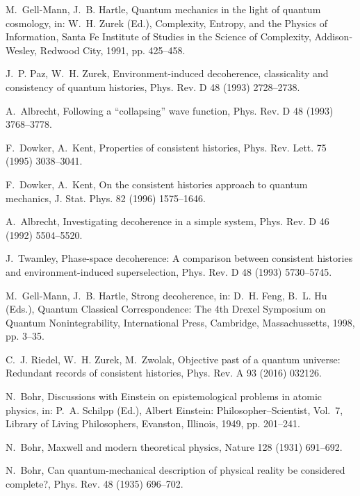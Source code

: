 \documentclass[3p,sort&compress,12pt]{elsarticle}
\begin{document}
\begin{thebibliography}{100}
M.~Gell-Mann, J.~B. Hartle, Quantum mechanics in the light of quantum
  cosmology, in: W.~H. Zurek (Ed.), Complexity, Entropy, and the Physics of
  Information, Santa Fe Institute of Studies in the Science of Complexity,
  Addison-Wesley, Redwood City, 1991, pp. 425--458.

J.~P. Paz, W.~H. Zurek, Environment-induced decoherence, classicality and
  consistency of quantum histories, Phys. Rev. D 48 (1993) 2728--2738.

A.~Albrecht, Following a ``collapsing'' wave function, Phys. Rev. D 48 (1993)
  3768--3778.

F.~Dowker, A.~Kent, Properties of consistent histories, Phys. Rev. Lett. 75
  (1995) 3038--3041.

F.~Dowker, A.~Kent, On the consistent histories approach to quantum mechanics,
  J. Stat. Phys. 82 (1996) 1575--1646.

A.~Albrecht, Investigating decoherence in a simple system, Phys. Rev. D 46
  (1992) 5504--5520.

J.~Twamley, Phase-space decoherence: {A} comparison between consistent
  histories and environment-induced superselection, Phys. Rev. D 48 (1993)
  5730--5745.

M.~Gell-Mann, J.~B. Hartle, Strong decoherence, in: D.~H. Feng, B.~L. Hu
  (Eds.), Quantum Classical Correspondence: The 4th Drexel Symposium on Quantum
  Nonintegrability, International Press, Cambridge, Massachussetts, 1998, pp.
  3--35.

C.~J. Riedel, W.~H. Zurek, M.~Zwolak, Objective past of a quantum universe:
  {R}edundant records of consistent histories, Phys. Rev. A 93 (2016) 032126.

N.~Bohr, Discussions with {E}instein on epistemological problems in atomic
  physics, in: P.~A. Schilpp (Ed.), Albert Einstein: Philosopher--Scientist,
  Vol.~7, Library of Living Philosophers, Evanston, Illinois, 1949, pp.
  201--241.

N.~Bohr, Maxwell and modern theoretical physics, Nature 128 (1931) 691--692.

N.~Bohr, Can quantum-mechanical description of physical reality be considered
  complete?, Phys. Rev. 48 (1935) 696--702.


\end{thebibliography}
\end{document}
